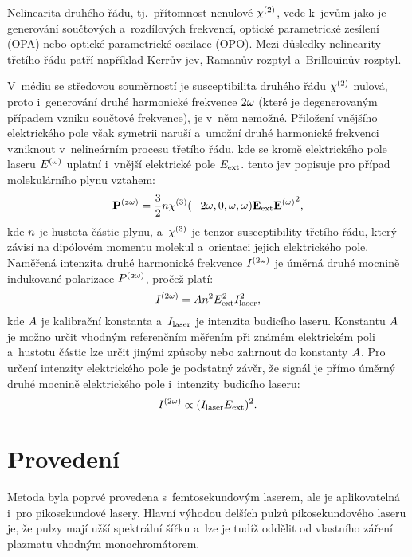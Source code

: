 Nelinearita druhého řádu, tj.~přítomnost nenulové $\chi^{(2)}$,
vede k~jevům jako je generování součtových a~rozdílových frekvencí,
optické parametrické zesílení (OPA) nebo optické parametrické oscilace (OPO).
Mezi důsledky nelinearity třetího řádu patří například
Kerrův jev, Ramanův rozptyl a~Brillouinův rozptyl.
\autocite{rpphotonics-polarization}

V~médiu se středovou souměrností je susceptibilita druhého řádu $\chi^{(2)}$
nulová, proto i~generování druhé harmonické frekvence $2\omega$
(které je degenerovaným případem vzniku součtové frekvence), je v~něm nemožné.
Přiložení vnějšího elektrického pole však symetrii naruší
a~umožní druhé harmonické frekvenci vzniknout v~nelineárním procesu třetího
řádu, kde se kromě elektrického pole laseru $E^{(\mathnormal{\omega})}$ uplatní
i~vnější elektrické pole $E_\text{ext}$.
 tento jev popisuje pro případ molekulárního plynu
vztahem:
\begin{equation}
	\label{eq:efishth-epolsh}
	\mathbf{P^{\mathnormal{(2\omega)}}} = \frac{3}{2} n \chi^{(3)}
	(-2\omega, 0, \omega, \omega)
	\mathbf{E_\text{ext}} \mathbf{E^{(\mathnormal{\omega})}}^2,
\end{equation}
kde $n$ je hustota částic plynu,
a~$\chi^{(3)}$ je tenzor susceptibility třetího řádu, který závisí
na dipólovém momentu molekul a~orientaci jejich elektrického pole.
\autocite{efish-2018}
Naměřená intenzita druhé harmonické frekvence $I^{(2\omega)}$
je úměrná druhé mocnině indukované polarizace $P^{\mathnormal{(2\omega)}}$, pročež platí:
\begin{equation}
	\label{eq:efishth-ity}
	I^{(2\omega)} = A n^2 E_\text{ext}^2 I_\text{laser}^2,
\end{equation}
kde $A$ je kalibrační konstanta
a~$I_\text{laser}$ je intenzita budicího laseru.
\autocite{efish-2018}
Konstantu $A$ je možno určit vhodným referenčním měřením
při známém elektrickém poli
a~hustotu částic lze určit jinými způsoby nebo zahrnout
do konstanty $A$.
Pro určení intenzity elektrického pole je podstatný závěr,
že signál \EFISH{} je přímo úměrný druhé mocnině elektrického pole
i~intenzity budicího laseru:
\begin{equation}
	\label{eq:efishth-prop-simple}
	I^{(2\omega)} \propto (I_\text{laser} E_\text{ext})^2.
\end{equation}

\section{Provedení}
\label{sec:efishth-setup}
Metoda \EFISH{} byla poprvé provedena s~femtosekundovým laserem,
ale je aplikovatelná i~pro pikosekundové lasery.
Hlavní výhodou delších pulzů pikosekundového laseru je,
že pulzy mají užší spektrální šířku a~lze je tudíž oddělit
od vlastního záření plazmatu vhodným monochromátorem.

